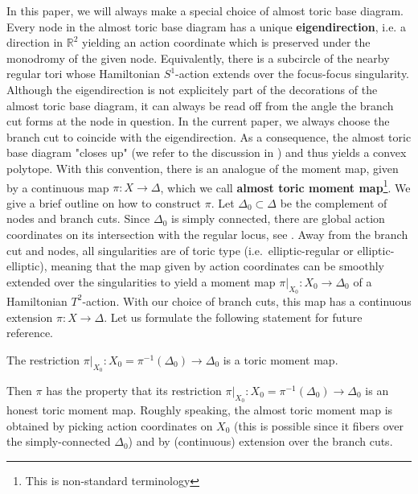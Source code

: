 \documentclass[12pt,a4paper,draft]{scrartcl}
\begin{document}
In this paper, we will always make a special choice of almost toric base diagram. Every node in the almost toric base diagram has a unique \textbf{eigendirection}, i.e. a direction in $\mathbb{R}^2$ yielding an action coordinate which is preserved under the monodromy of the given node. Equivalently, there is a subcircle of the nearby regular tori whose Hamiltonian $S^1$-action extends over the focus-focus singularity. Although the eigendirection is not explicitely part of the decorations of the almost toric base diagram, it can always be read off from the angle the branch cut forms at the node in question. In the current paper, we always choose the branch cut to coincide with the eigendirection. As a consequence, the almost toric base diagram "closes up" (we refer to the discussion in \cite[7.2]{evans2021atfs}) and thus yields a convex polytope. With this convention, there is an analogue of the moment map, given by a continuous map $\pi \colon X \rightarrow \Delta$, which we call \textbf{almost toric moment map}\footnote{This is non-standard terminology}. We give a brief outline on how to construct $\pi$. Let $\Delta_0 \subset \Delta$ be the complement of nodes and branch cuts. Since $\Delta_0$ is simply connected, there are global action coordinates on its intersection with the regular locus, see \cite{Dui80}. Away from the branch cut and nodes, all singularities are of toric type (i.e.\ elliptic-regular or elliptic-elliptic), meaning that the map given by action coordinates can be smoothly extended over the singularities to yield a moment map $\pi\vert_{X_0} \colon X_0 \rightarrow \Delta_0$ of a Hamiltonian $T^2$-action. With our choice of branch cuts, this map has a continuous extension $\pi \colon X \rightarrow \Delta$. Let us formulate the following statement for future reference. 

\begin{proposition}
    \label{thm:toricmomentmap}
    The restriction $\pi\vert_{X_0} \colon X_0 = \pi^{-1}(\Delta_0) \rightarrow \Delta_0$ is a toric moment map. 
\end{proposition}



Then $\pi$ has the property that its restriction $\pi\vert_{X_0} \colon X_0 = \pi^{-1}(\Delta_0) \rightarrow \Delta_0$ is an honest toric moment map. Roughly speaking, the almost toric moment map is obtained by picking action coordinates on $X_0$ (this is possible since it fibers over the simply-connected $\Delta_0$) and by (continuous) extension over the branch cuts. \\
\end{document}
